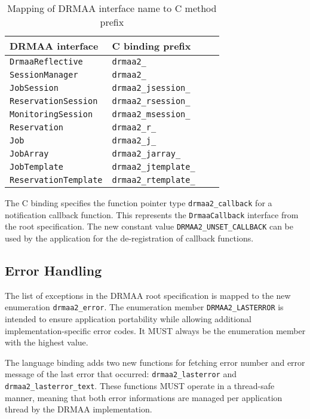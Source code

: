 \documentclass{article}
\newcommand{\h}[1]{\texttt{#1}}
\begin{document}
\begin{table}[ht]
\centering
\begin{tabularx}{\textwidth}{|X|X|l|X|}
\hline
DRMAA interface & C binding prefix \\
\hline
\h{DrmaaReflective} & \h{drmaa2\_} \\
\h{SessionManager} & \h{drmaa2\_} \\
\h{JobSession} & \h{drmaa2\_jsession\_} \\
\h{ReservationSession} & \h{drmaa2\_rsession\_} \\
\h{MonitoringSession}  & \h{drmaa2\_msession\_} \\
\h{Reservation} & \h{drmaa2\_r\_} \\
\h{Job} & \h{drmaa2\_j\_} \\
\h{JobArray} & \h{drmaa2\_jarray\_} \\
\h{JobTemplate} & \h{drmaa2\_jtemplate\_} \\
\h{ReservationTemplate} & \h{drmaa2\_rtemplate\_} \\
\hline
\end{tabularx}
\caption{Mapping of DRMAA interface name to C method prefix}
\label{tab:naming}
\end{table}

The C binding specifies the function pointer type \h{drmaa2\_callback} for a notification callback function. This represents the \h{DrmaaCallback} interface from the root specification. The new constant value \h{DRMAA2\_UNSET\_CALLBACK} can be used by the application for the de-registration of callback functions.

\subsection{Error Handling}

The list of exceptions in the DRMAA root specification is mapped to the new enumeration \h{drmaa2\_error}. The enumeration member \h{DRMAA2\_LASTERROR} is intended to ensure application portability while allowing additional implementation-specific error codes. It MUST always be the enumeration member with the highest value.

The language binding adds two new functions for fetching error number and error message of the last error that occurred: \h{drmaa2\_lasterror} and \h{drmaa2\_lasterror\_text}. These functions MUST operate in a thread-safe manner, meaning that both error informations are managed per application thread by the DRMAA implementation.
\end{document}
